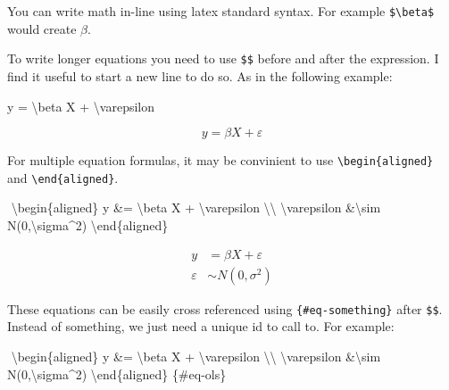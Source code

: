 \documentclass[
  11pts,
]{article}
\newenvironment{Shaded}{\begin{snugshade}}{\end{snugshade}}
\newcommand{\ExtensionTok}[1]{\textcolor[rgb]{0.00,0.23,0.31}{#1}}
\newcommand{\KeywordTok}[1]{\textcolor[rgb]{0.00,0.23,0.31}{#1}}
\newcommand{\NormalTok}[1]{\textcolor[rgb]{0.00,0.23,0.31}{#1}}
\newcommand{\SpecialCharTok}[1]{\textcolor[rgb]{0.37,0.37,0.37}{#1}}
\newcommand{\SpecialStringTok}[1]{\textcolor[rgb]{0.13,0.47,0.30}{#1}}
\begin{document}
You can write math in-line using latex standard syntax. For example
\texttt{\$\textbackslash{}beta\$} would create \(\beta\).

To write longer equations you need to use \texttt{\$\$} before and after
the expression. I find it useful to start a new line to do so. As in the
following example:

\begin{Shaded}
\begin{Highlighting}[]
\SpecialStringTok{$$y = }\SpecialCharTok{\textbackslash{}beta}\SpecialStringTok{ X + }\SpecialCharTok{\textbackslash{}varepsilon}
\SpecialStringTok{$$}
\end{Highlighting}
\end{Shaded}

\[y = \beta X + \varepsilon
\]

For multiple equation formulas, it may be convinient to use
\texttt{\textbackslash{}begin\{aligned\}} and
\texttt{\textbackslash{}end\{aligned\}}.

\begin{Shaded}
\begin{Highlighting}[]
\SpecialStringTok{$$}
\KeywordTok{\textbackslash{}begin}\NormalTok{\{}\ExtensionTok{aligned}\NormalTok{\}}
\SpecialStringTok{y \&= }\SpecialCharTok{\textbackslash{}beta}\SpecialStringTok{ X + }\SpecialCharTok{\textbackslash{}varepsilon}\SpecialStringTok{ }\SpecialCharTok{\textbackslash{}\textbackslash{}}
\SpecialCharTok{\textbackslash{}varepsilon}\SpecialStringTok{ \&}\SpecialCharTok{\textbackslash{}sim}\SpecialStringTok{ N(0,}\SpecialCharTok{\textbackslash{}sigma}\SpecialStringTok{\^{}2)}
\KeywordTok{\textbackslash{}end}\NormalTok{\{}\ExtensionTok{aligned}\NormalTok{\}}
\SpecialStringTok{$$}
\end{Highlighting}
\end{Shaded}

\[
\begin{aligned}
y &= \beta X + \varepsilon \\
\varepsilon &\sim N(0,\sigma^2)
\end{aligned}
\]

These equations can be easily cross referenced using
\texttt{\{\#eq-something\}} after \texttt{\$\$}. Instead of something,
we just need a unique id to call to. For example:

\begin{Shaded}
\begin{Highlighting}[]
\SpecialStringTok{$$}
\KeywordTok{\textbackslash{}begin}\NormalTok{\{}\ExtensionTok{aligned}\NormalTok{\}}
\SpecialStringTok{y \&= }\SpecialCharTok{\textbackslash{}beta}\SpecialStringTok{ X + }\SpecialCharTok{\textbackslash{}varepsilon}\SpecialStringTok{ }\SpecialCharTok{\textbackslash{}\textbackslash{}}
\SpecialCharTok{\textbackslash{}varepsilon}\SpecialStringTok{ \&}\SpecialCharTok{\textbackslash{}sim}\SpecialStringTok{ N(0,}\SpecialCharTok{\textbackslash{}sigma}\SpecialStringTok{\^{}2)}
\KeywordTok{\textbackslash{}end}\NormalTok{\{}\ExtensionTok{aligned}\NormalTok{\}}
\SpecialStringTok{$$}\NormalTok{\{\#eq{-}ols\}}
\end{Highlighting}
\end{Shaded}
\end{document}
